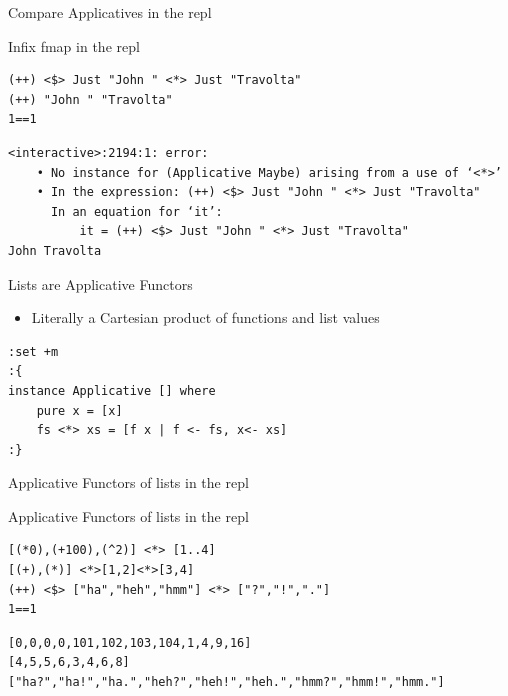 \documentclass[presetation]{beamer}
\begin{document}
\begin{frame}[fragile,label={sec:org527a5d3}]{Compare Applicatives in the repl}
 \begin{block}{Infix fmap in the repl}
\begin{verbatim}
(++) <$> Just "John " <*> Just "Travolta"
(++) "John " "Travolta"
1==1 
\end{verbatim}

\begin{verbatim}
<interactive>:2194:1: error:
    • No instance for (Applicative Maybe) arising from a use of ‘<*>’
    • In the expression: (++) <$> Just "John " <*> Just "Travolta"
      In an equation for ‘it’:
          it = (++) <$> Just "John " <*> Just "Travolta"
John Travolta
\end{verbatim}
\end{block}
\end{frame}

\begin{frame}[fragile,label={sec:org4fe792f}]{Lists are Applicative Functors}
 \begin{definition}
\begin{itemize}
\item Literally a Cartesian product of functions and list values
\end{itemize}
\begin{verbatim}
:set +m
:{
instance Applicative [] where
    pure x = [x]
    fs <*> xs = [f x | f <- fs, x<- xs]
:}
\end{verbatim}
\end{definition}
\end{frame}

\begin{frame}[fragile,label={sec:org6d8cc89}]{Applicative Functors of lists in the repl}
 \begin{block}{Applicative Functors of lists in the repl}
\begin{verbatim}
[(*0),(+100),(^2)] <*> [1..4]
[(+),(*)] <*>[1,2]<*>[3,4]
(++) <$> ["ha","heh","hmm"] <*> ["?","!","."]
1==1
\end{verbatim}

\begin{verbatim}
[0,0,0,0,101,102,103,104,1,4,9,16]
[4,5,5,6,3,4,6,8]
["ha?","ha!","ha.","heh?","heh!","heh.","hmm?","hmm!","hmm."]
\end{verbatim}
\end{block}
\end{frame}
\end{document}
